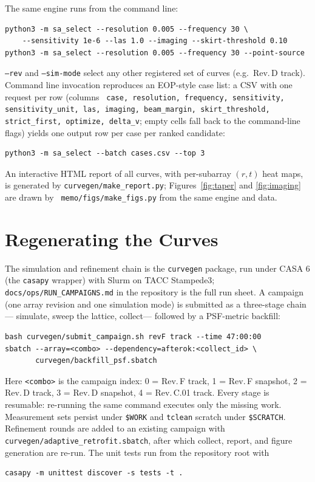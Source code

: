 \documentclass[11pt]{article}
\begin{document}
The same engine runs from the command line:
\begin{verbatim}
python3 -m sa_select --resolution 0.005 --frequency 30 \
    --sensitivity 1e-6 --las 1.0 --imaging --skirt-threshold 0.10
python3 -m sa_select --resolution 0.005 --frequency 30 --point-source
\end{verbatim}
{\tt --rev} and {\tt --sim-mode} select any other registered set of
curves (e.g.\ Rev.\,D track).  Command line invocation reproduces an
EOP-style case list: a CSV with one request per row (columns {\tt
  case, resolution, frequency, sensitivity, sensitivity\_unit, las,
  imaging, beam\_margin, skirt\_threshold, strict\_first, optimize,
  delta\_v}; empty cells fall back to the command-line flags) yields
one output row per case per ranked candidate:
\begin{verbatim}
python3 -m sa_select --batch cases.csv --top 3
\end{verbatim}

An interactive HTML report of all curves, with per-subarray
$(r,t)$ heat maps, is generated by {\tt curvegen/make\_report.py};
Figures~\ref{fig:taper} and \ref{fig:imaging} are drawn by {\tt
memo/figs/make\_figs.py} from the same engine and data.

\section{Regenerating the Curves}
\label{sec:regen}

The simulation and refinement chain is the {\tt curvegen} package,
run under CASA 6 (the {\tt casapy} wrapper) with Slurm on TACC
Stampede3; {\tt docs/ops/RUN\_CAMPAIGNS.md} in the repository is the
full run sheet.  A campaign (one array revision and one simulation
mode) is submitted as a three-stage chain--- simulate, sweep the
lattice, collect--- followed by a PSF-metric backfill:
\begin{verbatim}
bash curvegen/submit_campaign.sh revF track --time 47:00:00
sbatch --array=<combo> --dependency=afterok:<collect_id> \
       curvegen/backfill_psf.sbatch
\end{verbatim}
Here {\tt <combo>} is the campaign index: 0 = Rev.\,F track, 1 =
Rev.\,F snapshot, 2 = Rev.\,D track, 3 = Rev.\,D snapshot, 4 =
Rev.\,C.01 track.  Every stage is resumable: re-running the same command executes only
the missing work.  Measurement sets persist under {\tt \$WORK} and
{\tt tclean} scratch under {\tt \$SCRATCH}.  Refinement rounds are
added to an existing campaign with {\tt
curvegen/adaptive\_retrofit.sbatch}, after which collect, report,
and figure generation are re-run.  The unit tests run from the
repository root with
\begin{verbatim}
casapy -m unittest discover -s tests -t .
\end{verbatim}
\end{document}
